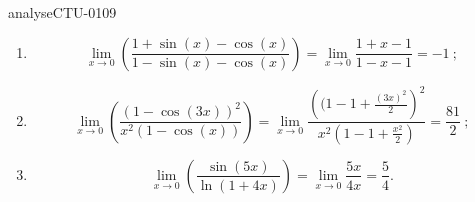 
\begin{corrige}{analyseCTU-0109}
 
   \begin{enumerate}
   \item 
     \begin{equation*}
       \lim_{x\to 0}\left(\frac{1+\sin (x)-\cos(x)}{1-\sin (x)-\cos(x)}\right) = \lim_{x\to 0} \frac{1+x-1}{1-x-1} =-1\:;
     \end{equation*}
    \item 
      \begin{equation*}
        \lim_{x\to 0}\left(\frac{(1-\cos(3x))^2}{x^2(1-\cos(x))}\right) = \lim_{x\to 0} \frac{\left((1-1+\frac{(3x)^2}{2}\right)^2}{x^2\left(1-1+\frac{x^2}{2}\right)} = \frac{81}{2} \:;
      \end{equation*}
    \item 
      \begin{equation*}
        \lim_{x\to 0}\left(\frac{\sin (5x)}{\ln(1+4x)}\right)=\lim_{x\to 0}\frac{5x }{4x} = \frac{5}{4}.
      \end{equation*}
   \end{enumerate}


\end{corrige}
